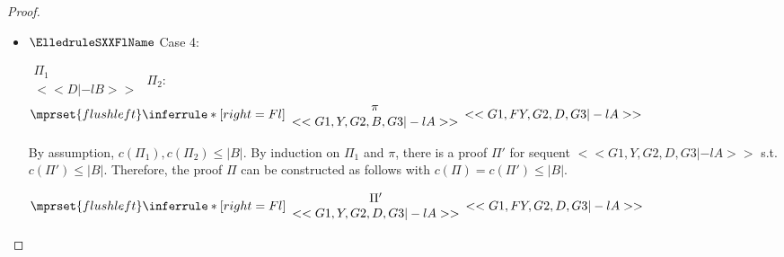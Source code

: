 \begin{proof}
\begin{enumerate}
\begin{itemize}
  \item $\ElledruleSXXFlName$ Case 4:
    \begin{center}
      \scriptsize
      \begin{math}
        \begin{array}{c}
          \Pi_1 \\
          {<<D |-l B>>}
        \end{array}
      \end{math}
      \qquad\qquad
      $\Pi_2$:
      \begin{math}
        $$\mprset{flushleft}
        \inferrule* [right={\tiny Fl}] {
          {
            \begin{array}{c}
              \pi \\
              {<<G1, Y, G2, B, G3 |-l A>>}
            \end{array}
          }
        }{<<G1, F Y, G2, D, G3 |-l A>>}
      \end{math}
    \end{center}
    By assumption, $c(\Pi_1),c(\Pi_2)\leq |B|$. By induction on $\Pi_1$ and $\pi$, there is a
    proof $\Pi'$ for sequent $<<G1, Y, G2, D, G3 |-l A>>$ s.t. $c(\Pi') \leq |B|$. Therefore,
    the proof $\Pi$ can be constructed as follows with $c(\Pi) = c(\Pi') \leq |B|$.
    \begin{center}
      \scriptsize
      \begin{math}
        $$\mprset{flushleft}
        \inferrule* [right={\tiny Fl}] {
          {
            \begin{array}{c}
              \Pi' \\
              {<<G1, Y, G2, D, G3 |-l A>>}
            \end{array}
          }
        }{<<G1, F Y, G2, D, G3 |-l A>>}
      \end{math}
    \end{center}


\end{itemize}
\end{enumerate}
\end{proof}
